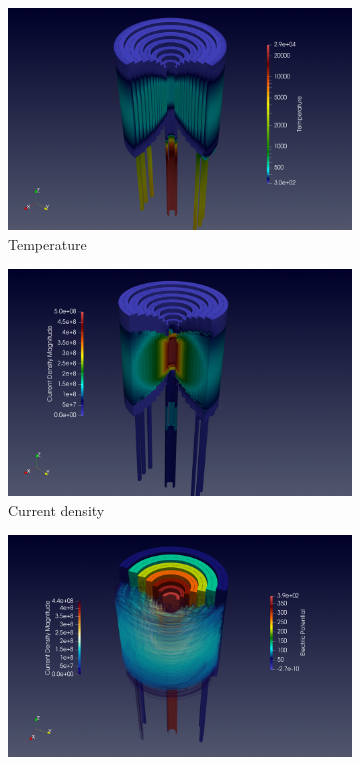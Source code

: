 \begin{figure}[!ht]
  \centering
  \begin{subfigure}[c]{0.49\textwidth}
    \centering
    \includegraphics[width=\textwidth]{graphics/feelpp/feelpp-benchmark-HL-31-temperature.png}
    \caption{Temperature}
  \end{subfigure}
  \hfill
  \begin{subfigure}[c]{0.49\textwidth}
    \centering
    \includegraphics[width=\textwidth]{graphics/feelpp/feelpp-benchmark-HL-31-current_density.png}
    \caption{Current density}
  \end{subfigure}
  \begin{subfigure}[c]{0.49\textwidth}
    \centering
    \includegraphics[width=\textwidth]{graphics/feelpp/feelpp-benchmark-HL-31-potential_density_streamines.png}

\end{subfigure}
\end{figure}
